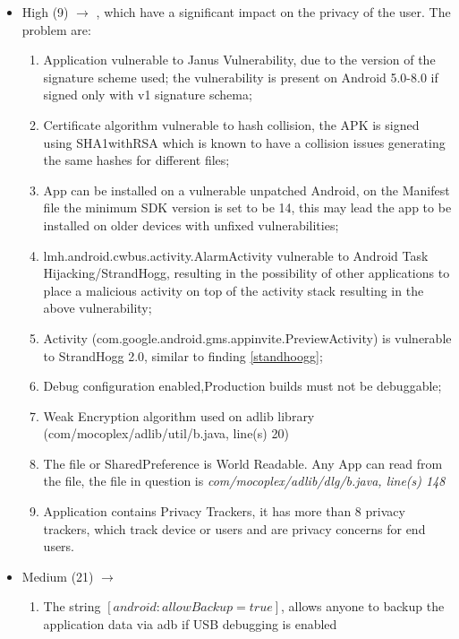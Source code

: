     \begin{itemize}
        \item High (9) $\rightarrow$ , which have a significant impact on the privacy of the user. The problem are:
        \begin{enumerate}
            \item Application vulnerable to Janus Vulnerability, due to the version of the signature scheme used; the vulnerability is present on Android 5.0-8.0 if signed only with v1 signature schema;
            \item  Certificate algorithm vulnerable to hash collision, the APK is signed using SHA1withRSA which is known to have a collision issues generating the same hashes for different files;
            \item  App can be installed on a vulnerable unpatched Android, on the Manifest file the minimum SDK version is set to be 14, this may lead the app to be installed on older devices with unfixed vulnerabilities;
            \item \label{standhoogg} lmh.android.cwbus.activity.AlarmActivity vulnerable to Android Task Hijacking/StrandHogg, resulting in the possibility of other applications to place a malicious activity on top of the activity stack resulting in the above vulnerability;
            \item  Activity (com.google.android.gms.appinvite.PreviewActivity) is vulnerable to StrandHogg 2.0, similar to finding \ref{standhoogg};
            \item Debug configuration enabled,Production builds must not be debuggable;
            \item Weak Encryption algorithm used on adlib library (com/mocoplex/adlib/util/b.java, line(s) 20)
            \item The file or SharedPreference is World Readable. Any App can read from the file, the file in question is \textit{ com/mocoplex/adlib/dlg/b.java, line(s) 148}
            \item  Application contains Privacy Trackers, it has more than 8 privacy trackers, which track device or users and are privacy concerns for end users.
        \end{enumerate}
        \item Medium (21) $\rightarrow$ \begin{enumerate}
            \item The string $[android:allowBackup=true]$, allows anyone to backup the application data via adb if USB debugging is enabled

\end{enumerate}
\end{itemize}

